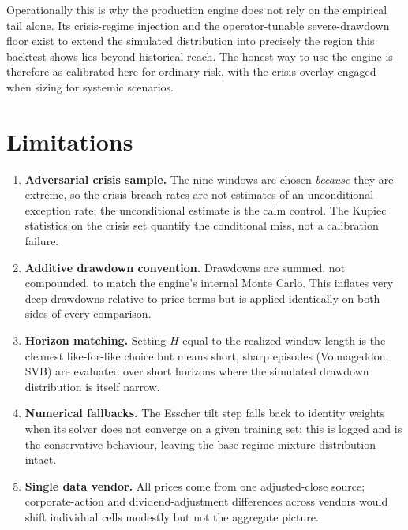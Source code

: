 \documentclass[11pt]{article}
\begin{document}
Operationally this is why the production engine does not rely on the empirical
tail alone. Its crisis-regime injection and the operator-tunable
severe-drawdown floor exist to extend the simulated distribution into precisely
the region this backtest shows lies beyond historical reach. The honest way to
use the engine is therefore as calibrated here for ordinary risk, with the
crisis overlay engaged when sizing for systemic scenarios.

\section{Limitations}
\begin{enumerate}[leftmargin=1.6em, itemsep=2pt]
  \item \textbf{Adversarial crisis sample.} The nine windows are chosen
  \emph{because} they are extreme, so the crisis breach rates are not estimates
  of an unconditional exception rate; the unconditional estimate is the calm
  control. The Kupiec statistics on the crisis set quantify the conditional
  miss, not a calibration failure.
  \item \textbf{Additive drawdown convention.} Drawdowns are summed, not
  compounded, to match the engine's internal Monte Carlo. This inflates very
  deep drawdowns relative to price terms but is applied identically on both
  sides of every comparison.
  \item \textbf{Horizon matching.} Setting $H$ equal to the realized window
  length is the cleanest like-for-like choice but means short, sharp episodes
  (Volmageddon, SVB) are evaluated over short horizons where the simulated
  drawdown distribution is itself narrow.
  \item \textbf{Numerical fallbacks.} The Esscher tilt step falls back to
  identity weights when its solver does not converge on a given training set;
  this is logged and is the conservative behaviour, leaving the base
  regime-mixture distribution intact.
  \item \textbf{Single data vendor.} All prices come from one adjusted-close
  source; corporate-action and dividend-adjustment differences across vendors
  would shift individual cells modestly but not the aggregate picture.
\end{enumerate}

\end{document}
